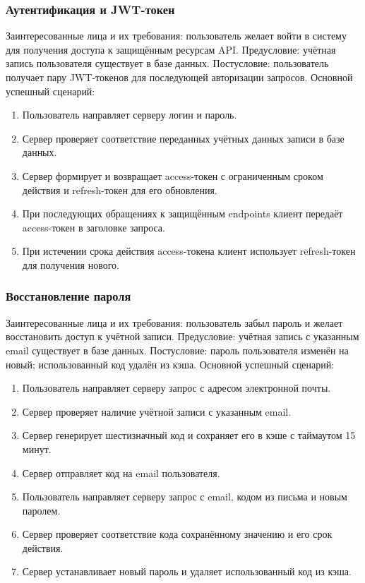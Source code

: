 \subsubsection{Аутентификация и JWT-токен}
Заинтересованные лица и их требования: пользователь желает войти в систему для получения доступа к защищённым ресурсам API.
Предусловие: учётная запись пользователя существует в базе данных.
Постусловие: пользователь получает пару JWT-токенов для последующей авторизации запросов.
Основной успешный сценарий:
\begin{enumerate}
\item Пользователь направляет серверу логин и пароль.
\item Сервер проверяет соответствие переданных учётных данных записи в базе данных.
\item Сервер формирует и возвращает access-токен с ограниченным сроком действия и refresh-токен для его обновления.
\item При последующих обращениях к защищённым endpoints клиент передаёт access-токен в заголовке запроса.
\item При истечении срока действия access-токена клиент использует refresh-токен для получения нового.
\end{enumerate}

\subsubsection{Восстановление пароля}
Заинтересованные лица и их требования: пользователь забыл пароль и желает восстановить доступ к учётной записи.
Предусловие: учётная запись с указанным email существует в базе данных.
Постусловие: пароль пользователя изменён на новый; использованный код удалён из кэша.
Основной успешный сценарий:
\begin{enumerate}
\item Пользователь направляет серверу запрос с адресом электронной почты.
\item Сервер проверяет наличие учётной записи с указанным email.
\item Сервер генерирует шестизначный код и сохраняет его в кэше с таймаутом 15 минут.
\item Сервер отправляет код на email пользователя.
\item Пользователь направляет серверу запрос с email, кодом из письма и новым паролем.
\item Сервер проверяет соответствие кода сохранённому значению и его срок действия.
\item Сервер устанавливает новый пароль и удаляет использованный код из кэша.
\end{enumerate}

